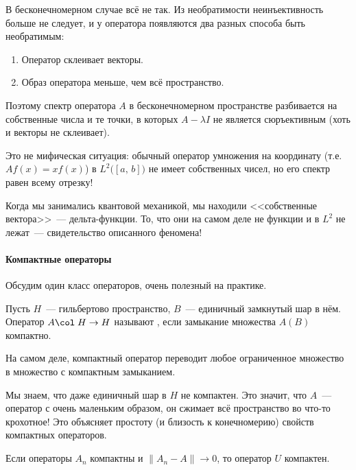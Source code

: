 \documentclass{trlnotes}
\begin{document}
    В бесконечномерном случае всё не так. Из необратимости неинъективность больше не следует, и у оператора появляются два разных способа быть необратимым:

    \begin{enumerate}
        \item Оператор склеивает векторы.
        \item Образ оператора меньше, чем всё пространство.
    \end{enumerate}

    Поэтому спектр оператора $A$ в бесконечномерном пространстве разбивается на собственные числа и те точки, в которых $A - \lambda I$ не является сюръективным (хоть и векторы не склеивает). 

    \begin{rem}
        Это не мифическая ситуация: обычный оператор умножения на координату (т.е. $Af(x) = x f(x)$) в $L^2\big([a, \, b]\big)$ не имеет собственных чисел, но его спектр равен всему отрезку! 

        Когда мы занимались квантовой механикой, мы находили <<собственные вектора>>~--- дельта-функции. То, что они на самом деле не функции и в $L^2$ не лежат~--- свидетельство описанного феномена!
    \end{rem}

    \paragraph{Компактные операторы}

    Обсудим один класс операторов, очень полезный на практике.

    \begin{de}
        Пусть $H$~--- гильбертово пространство, $B$~--- единичный замкнутый шар в нём. Оператор $A\col \; H \to H$ называют , если замыкание множества $A(B)$ компактно.
    \end{de}

    \begin{rem}
        На самом деле, компактный оператор переводит любое ограниченное множество в множество с компактным замыканием.
    \end{rem}

    Мы знаем, что даже единичный шар в $H$ не компактен. Это значит, что $A$~--- оператор с очень маленьким образом, он сжимает всё пространство во что-то крохотное! Это объясняет простоту (и близость к конечномерию) свойств компактных операторов.

    \begin{st}
        Если операторы $A_n$ компактны и $\|A_n - A\| \to 0$, то оператор $U$ компактен.
    \end{st}
\end{document}
